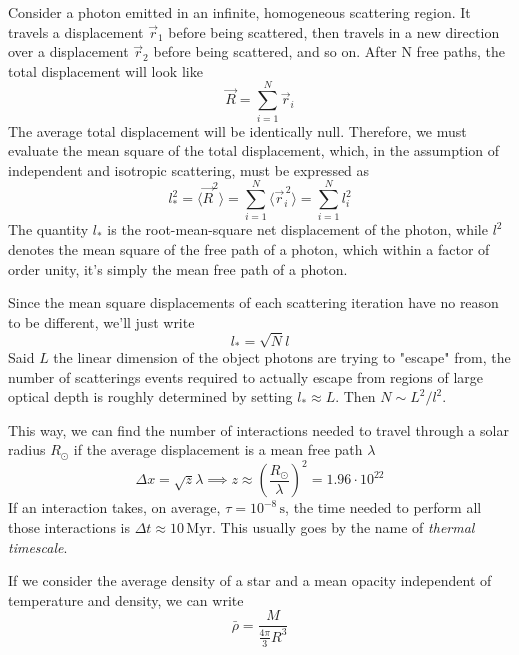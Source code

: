\par Consider a photon emitted in an infinite, homogeneous scattering region. It travels a displacement $\vec{r}_{1}$ before being scattered, then travels in a new direction over a displacement $\vec{r}_{2}$ before being scattered, and so on. After N free paths, the total displacement will look like 
\begin{equation*}
    \vec{R} = \sum_{i=1}^{N}\vec{r}_{i}
\end{equation*}
The average total displacement will be identically null. Therefore, we must evaluate the mean square of the total displacement, which, in the assumption of independent and isotropic scattering, must be expressed as 
\begin{equation*}
    l_{*}^{2} = \langle\vec{R}^{2}\rangle = \sum_{i=1}^{N}\langle\vec{r}_{i}^{\,2}\rangle = \sum_{i=1}^{N} l^{2}_{i}
\end{equation*}
The quantity $l_{*}$ is the root-mean-square net displacement of the photon, while $l^{2}$ denotes the mean square of the free path of a photon, which within a factor of order unity, it's simply the mean free path of a photon.
\par Since the mean square displacements of each scattering iteration have no reason to be different, we'll just write 
\begin{equation*}
    l_{*} = \sqrt{N}l
\end{equation*}
Said $L$ the linear dimension of the object photons are trying to "escape" from, the number of scatterings events required to actually escape from regions of large optical depth is roughly determined by setting $l_{*} \approx L$. Then $N \sim L^{2}/l^{2}$.
\par This way, we can find the number of interactions needed to travel through a solar radius $R_{\odot}$ if the average displacement is a mean free path $\lambda$
\begin{equation*}
	\Delta x = \sqrt{z}\lambda \implies z\approx\left(\frac{R_{\odot}}{\lambda}\right)^{2} = 1.96\cdot10^{22}
\end{equation*}
If an interaction takes, on average, $\tau = 10^{-8}\,\text{s}$, the time needed to perform all those interactions is $\Delta t \approx 10\,\text{Myr}$. This usually goes by the name of \emph{thermal timescale}.
\par If we consider the average density of a star and a mean opacity independent of temperature and density, we can write
\begin{equation*}
	\bar{\rho} = \frac{M}{\frac{4\pi}{3}R^{3}}
\end{equation*}
